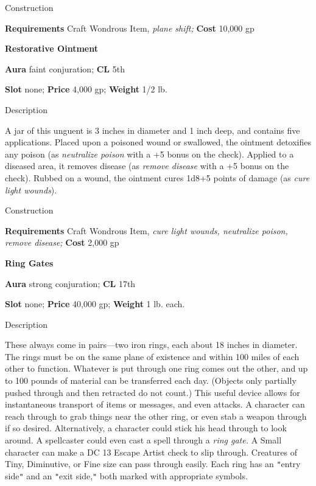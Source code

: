 Construction
				
\textbf{Requirements} Craft Wondrous Item,\textit{ plane shift;}\textbf{ Cost }10,000 gp
				
\textbf{Restorative Ointment}
				
\textbf{Aura} faint conjuration;\textbf{ CL }5th
				
\textbf{Slot} none; \textbf{Price} 4,000 gp; \textbf{Weight} 1/2 lb.
				
Description
				
A jar of this unguent is 3 inches in diameter and 1 inch deep, and contains five applications. Placed upon a poisoned wound or swallowed, the ointment detoxifies any poison (as \textit{neutralize poison} with a +5 bonus on the check). Applied to a diseased area, it removes disease (as \textit{remove disease }with a +5 bonus on the check). Rubbed on a wound, the ointment cures 1d8+5 points of damage (as \textit{cure light wounds}). 
				
Construction
				
\textbf{Requirements} Craft Wondrous Item,\textit{ cure light wounds, neutralize poison, remove disease;}\textbf{ Cost }2,000 gp
				
\textbf{Ring Gates}
				
\textbf{Aura} strong conjuration;\textbf{ CL }17th
				
\textbf{Slot} none; \textbf{Price} 40,000 gp; \textbf{Weight} 1 lb. each.
				
Description
				
These always come in pairs---two iron rings, each about 18 inches in diameter. The rings must be on the same plane of existence and within 100 miles of each other to function. Whatever is put through one ring comes out the other, and up to 100 pounds of material can be transferred each day. (Objects only partially pushed through and then retracted do not count.) This useful device allows for instantaneous transport of items or messages, and even attacks. A character can reach through to grab things near the other ring, or even stab a weapon through if so desired. Alternatively, a character could stick his head through to look around. A spellcaster could even cast a spell through a \textit{ring gate.} A Small character can make a DC 13 Escape Artist check to slip through. Creatures of Tiny, Diminutive, or Fine size can pass through easily. Each ring has an \texttt{{}"{}}entry side\texttt{{}"{}} and an \texttt{{}"{}}exit side,\texttt{{}"{}} both marked with appropriate symbols. 
				
